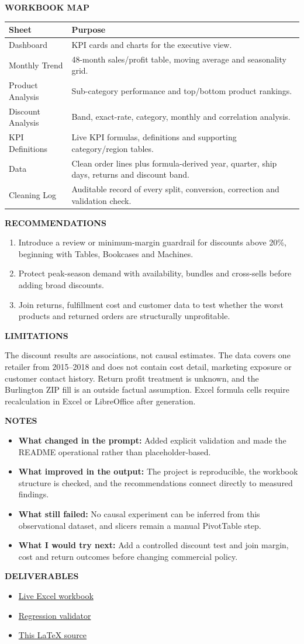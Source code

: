\documentclass[11pt,a4paper]{article}
\newcommand{\kicker}[1]{{\sffamily\bfseries\small\color{teal}\MakeUppercase{#1}}}
\newcommand{\lbl}[1]{{\sffamily\bfseries\footnotesize\color{muted}\MakeUppercase{#1}}}
\newcommand{\sect}[1]{\needspace{5\baselineskip}\vspace{0.5em}\par\kicker{#1}\par\vspace{-0.5em}{\color{rule}\rule{\linewidth}{0.5pt}}\par\vspace{-0.2em}}
\newcommand{\notes}[4]{%
\lbl{Notes}\par
\begin{itemize}
  \item \textbf{What changed in the prompt:} #1
  \item \textbf{What improved in the output:} #2
  \item \textbf{What still failed:} #3
  \item \textbf{What I would try next:} #4
\end{itemize}}
\begin{document}
\sect{Workbook map}
\begin{tabularx}{\linewidth}{@{}lX@{}}
\toprule
\textbf{Sheet} & \textbf{Purpose}\\
\midrule
Dashboard & KPI cards and charts for the executive view.\\
Monthly Trend & 48-month sales/profit table, moving average and seasonality grid.\\
Product Analysis & Sub-category performance and top/bottom product rankings.\\
Discount Analysis & Band, exact-rate, category, monthly and correlation analysis.\\
KPI Definitions & Live KPI formulas, definitions and supporting category/region tables.\\
Data & Clean order lines plus formula-derived year, quarter, ship days, returns and discount band.\\
Cleaning Log & Auditable record of every split, conversion, correction and validation check.\\
\bottomrule
\end{tabularx}

\sect{Recommendations}
\begin{enumerate}[leftmargin=1.5em,itemsep=2pt]
  \item Introduce a review or minimum-margin guardrail for discounts above 20\%,
  beginning with Tables, Bookcases and Machines.
  \item Protect peak-season demand with availability, bundles and cross-sells
  before adding broad discounts.
  \item Join returns, fulfillment cost and customer data to test whether the
  worst products and returned orders are structurally unprofitable.
\end{enumerate}

\sect{Limitations}
The discount results are associations, not causal estimates. The data covers
one retailer from 2015--2018 and does not contain cost detail, marketing
exposure or customer contact history. Return profit treatment is unknown, and
the Burlington ZIP fill is an outside factual assumption. Excel formula cells
require recalculation in Excel or LibreOffice after generation.

\notes{Added explicit validation and made the README operational rather than
placeholder-based.}{The project is reproducible, the workbook structure is
checked, and the recommendations connect directly to measured findings.}{No
causal experiment can be inferred from this observational dataset, and slicers
remain a manual PivotTable step.}{Add a controlled discount test and join
margin, cost and return outcomes before changing commercial policy.}

\sect{Deliverables}
\begin{itemize}
  \item \href{run:../superstore_beginner.xlsx}{Live Excel workbook}
  \item \href{run:../scripts/validate_project.py}{Regression validator}
  \item \href{run:beginner_report.tex}{This LaTeX source}
\end{itemize}
\end{document}
